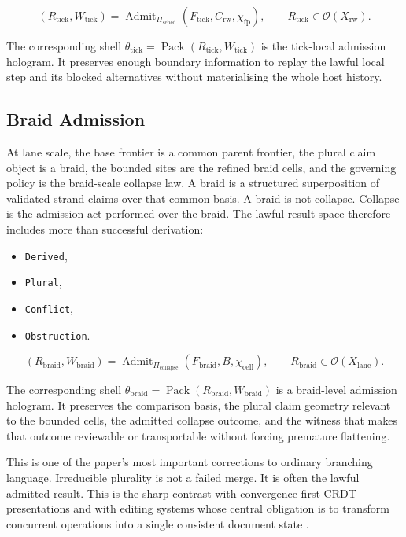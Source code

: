 \documentclass[11pt]{article}
\theoremstyle{definition}
\theoremstyle{plain}
\theoremstyle{remark}
\begin{document}
\[
(R_{\mathrm{tick}}, W_{\mathrm{tick}})
=
\operatorname{Admit}_{\Pi_{\mathrm{sched}}}
(F_{\mathrm{tick}}, C_{\mathrm{rw}}, \chi_{\mathrm{fp}}),
\qquad
R_{\mathrm{tick}} \in \mathcal{O}(X_{\mathrm{rw}}).
\]

The corresponding shell
\(\theta_{\mathrm{tick}} = \operatorname{Pack}(R_{\mathrm{tick}}, W_{\mathrm{tick}})\)
is the tick-local admission hologram. It preserves enough boundary information
to replay the lawful local step and its blocked alternatives without
materialising the whole host history.

\subsection{Braid Admission}

At lane scale, the base frontier is a common parent frontier, the plural claim object is a braid, the bounded sites are the refined braid cells, and the governing policy is the braid-scale collapse law. A braid is a structured superposition of validated strand claims over that common basis. A braid is not collapse. Collapse is the admission act performed over the braid. The lawful result space therefore includes more than successful derivation:

\begin{itemize}[leftmargin=*]
  \item \texttt{Derived},
  \item \texttt{Plural},
  \item \texttt{Conflict},
  \item \texttt{Obstruction}.
\end{itemize}

\[
(R_{\mathrm{braid}}, W_{\mathrm{braid}})
=
\operatorname{Admit}_{\Pi_{\mathrm{collapse}}}
(F_{\mathrm{braid}}, B, \chi_{\mathrm{cell}}),
\qquad
R_{\mathrm{braid}} \in \mathcal{O}(X_{\mathrm{lane}}).
\]

The corresponding shell
\(\theta_{\mathrm{braid}} = \operatorname{Pack}(R_{\mathrm{braid}}, W_{\mathrm{braid}})\)
is a braid-level admission hologram. It preserves the comparison basis, the
plural claim geometry relevant to the bounded cells, the admitted collapse
outcome, and the witness that makes that outcome reviewable or transportable
without forcing premature flattening.

This is one of the paper's most important corrections to ordinary branching language. Irreducible plurality is not a failed merge. It is often the lawful admitted result. This is the sharp contrast with convergence-first CRDT presentations and with editing systems whose central obligation is to transform concurrent operations into a single consistent document state \cite{ellis1989groupware,shapiro2011crdt}.
\end{document}
